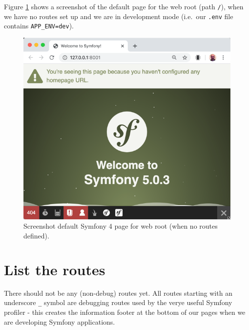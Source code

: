 \documentclass[a4paperpaper,openright]{book}
\newenvironment{Shaded}{}{}
\newcommand{\ExtensionTok}[1]{#1}
\newcommand{\NormalTok}[1]{#1}
\begin{document}
\begin{Shaded}
\end{Shaded}

Figure \ref{default_page} shows a screenshot of the default page for the
web root (path \texttt{/}), when we have no routes set up and we are in
development mode (i.e.~our \texttt{.env} file contains
\texttt{APP\_ENV=dev}).

\begin{figure}
\centering
\includegraphics{./tex2pdf.-65f13e14688ab55b/271098101c6e08a7fad30eb75ff110e370abc4c2.png}
\caption{Screenshot default Symfony 4 page for web root (when no routes
defined). \label{default_page}}
\end{figure}

\hypertarget{list-the-routes}{%
\section{List the routes}\label{list-the-routes}}

There should not be any (non-debug) routes yet. All routes starting with
an underscore \texttt{\_} symbol are debugging routes used by the verye
useful Symfony profiler - this creates the information footer at the
bottom of our pages when we are developing Symfony applications.
\end{document}
